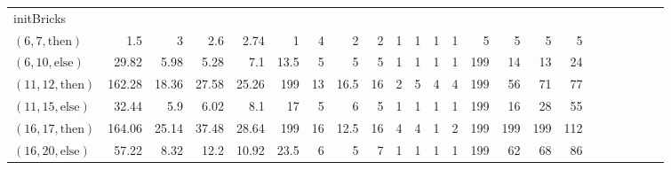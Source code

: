 \documentclass[sigconf]{acmart}
\newcommand{\thenBr}{\text{then}}
\newcommand{\elseBr}{\text{else}}
\newcommand{\inFor}{\text{inFor}}
\begin{document}
\begin{table*}
{\begin{tabular}{l|rrrr|rrrr|rrrr|rrrr|r|r|r|r|r|r}
    \midrule
    initBricks        &             &             &                &               &       &       &         &         &          &          &            &             &          &         &            & & & & & & & \\
    $(6,7,\thenBr)$   & 1.5         & 3           & 2.6            & 2.74          & 1     & 4     & 2       & 2       & 1        & 1        & 1          & 1           & 5        & 5       & 5          & 5 & & & & & & \\
    $(6,10,\elseBr)$  & 29.82       & 5.98        & 5.28           & 7.1           & 13.5  & 5     & 5       & 5       & 1        & 1        & 1          & 1           & 199      & 14      & 13         & 24 & & & & & & \\
    $(11,12,\thenBr)$ & 162.28      & 18.36       & 27.58          & 25.26         & 199   & 13    & 16.5    & 16      & 2        & 5        & 4          & 4           & 199      & 56      & 71         & 77 & & & & & & \\
    $(11,15,\elseBr)$ & 32.44       & 5.9         & 6.02           & 8.1           & 17    & 5     & 6       & 5       & 1        & 1        & 1          & 1           & 199      & 16      & 28         & 55 & & & & & & \\
    $(16,17,\thenBr)$ & 164.06      & 25.14       & 37.48          & 28.64         & 199   & 16    & 12.5    & 16      & 4        & 4        & 1          & 2           & 199      & 199     & 199        & 112 & & & & & & \\
    $(16,20,\elseBr)$ & 57.22       & 8.32        & 12.2           & 10.92         & 23.5  & 6     & 5       & 7       & 1        & 1        & 1          & 1           & 199      & 62      & 68         & 86 & & & & & & \\

\end{tabular}}
\end{table*}
\end{document}
